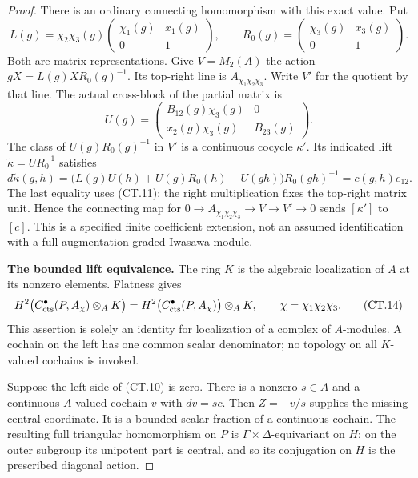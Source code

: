 \documentclass[11pt,a4paper]{article}
\theoremstyle{definition}
\begin{document}
\begin{proof}
There is an ordinary connecting homomorphism with this exact value.
Put
\[
 L(g)=\chi_2\chi_3(g)
       \begin{pmatrix}\chi_1(g)&x_1(g)\\0&1\end{pmatrix},
 \qquad
 R_0(g)=\begin{pmatrix}\chi_3(g)&x_3(g)\\0&1\end{pmatrix}.
\]
Both are matrix representations. Give \(V=M_2(A)\) the action
\(gX=L(g)X R_0(g)^{-1}\). Its top-right line is
\(A_{\chi_1\chi_2\chi_3}\). Write \(V'\) for the quotient
by that line. The actual cross-block of the partial matrix is
\[
 U(g)=\begin{pmatrix}
             B_{12}(g)\chi_3(g)&0\\
             x_2(g)\chi_3(g)&B_{23}(g)
       \end{pmatrix}.
\]
The class of \(U(g)R_0(g)^{-1}\) in \(V'\) is a
continuous cocycle \(\kappa'\). Its indicated lift
\(\widetilde\kappa=UR_0^{-1}\) satisfies
\[
 d\widetilde\kappa(g,h)
  =\bigl(L(g)U(h)+U(g)R_0(h)-U(gh)\bigr)R_0(gh)^{-1}
  =c(g,h)e_{12}.
 \tag{CT.13}
\]
The last equality uses (CT.11); the right multiplication fixes the
top-right matrix unit. Hence the connecting map for
\(0\to A_{\chi_1\chi_2\chi_3}\to V\to V'\to0\)
sends \([\kappa']\) to \([c]\). This is a specified finite
coefficient extension, not an assumed identification with a full
augmentation-graded Iwasawa module.

\par\medskip\noindent\textbf{The bounded lift equivalence.}
The ring \(K\) is the algebraic localization of \(A\) at its
nonzero elements. Flatness gives
\[
 H^2\bigl(C^\bullet_{\rm cts}(P,A_\chi)\otimes_A K\bigr)
   =H^2\bigl(C^\bullet_{\rm cts}(P,A_\chi)\bigr)\otimes_A K,
 \qquad \chi=\chi_1\chi_2\chi_3.
 \tag{CT.14}
\]
This assertion is solely an identity for localization of a complex
of \(A\)-modules. A cochain on the left has one common scalar
denominator; no topology on all \(K\)-valued cochains is invoked.

Suppose the left side of (CT.10) is zero. There is a nonzero
\(s\in A\) and a continuous \(A\)-valued cochain \(v\) with
\(dv=sc\). Then \(Z=-v/s\) supplies the missing central
coordinate. It is a bounded scalar fraction of a continuous cochain.
The resulting full triangular homomorphism on \(P\) is
\(\Gamma\times\Delta\)-equivariant on \(H\): on the outer
subgroup its unipotent part is central, and so its conjugation on
\(H\) is the prescribed diagonal action.


\end{proof}
\end{document}
